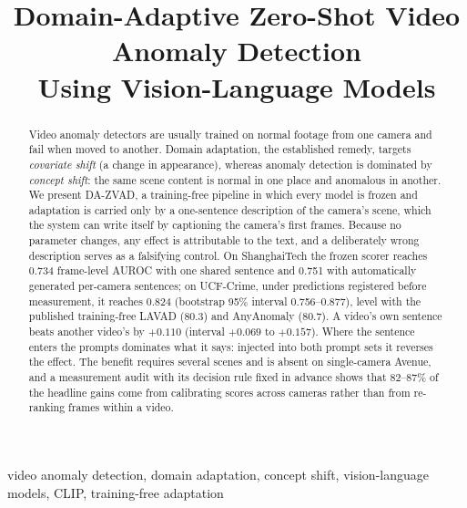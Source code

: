 \documentclass[conference]{IEEEtran}
\begin{document}
\title{Domain-Adaptive Zero-Shot Video Anomaly Detection\\
Using Vision-Language Models}

\author{
}

\maketitle

\begin{abstract}
Video anomaly detectors are usually trained on normal footage from one camera
and fail when moved to another. Domain adaptation, the established remedy,
targets \emph{covariate shift} (a change in appearance), whereas anomaly
detection is dominated by \emph{concept shift}: the same scene content is
normal in one place and anomalous in another. We present DA-ZVAD, a
training-free pipeline in which every model is frozen and adaptation is carried
only by a one-sentence description of the camera's scene, which the system can
write itself by captioning the camera's first frames. Because no parameter
changes, any effect is attributable to the text, and a deliberately wrong
description serves as a falsifying control. On ShanghaiTech the frozen scorer
reaches 0.734 frame-level AUROC with one shared sentence and 0.751 with
automatically generated per-camera sentences; on UCF-Crime, under predictions
registered before measurement, it reaches 0.824 (bootstrap 95\% interval
0.756--0.877), level with the published training-free LAVAD (80.3) and
AnyAnomaly (80.7). A video's own sentence beats another video's by $+0.110$
(interval $+0.069$ to $+0.157$). Where the sentence enters the prompts dominates
what it says: injected into both prompt sets it reverses the effect. The benefit
requires several scenes and is absent on single-camera Avenue, and a measurement
audit with its decision rule fixed in advance shows that 82--87\% of the
headline gains come from calibrating scores across cameras rather than from
re-ranking frames within a video.
\end{abstract}

\begin{IEEEkeywords}
video anomaly detection, domain adaptation, concept shift, vision-language
models, CLIP, training-free adaptation
\end{IEEEkeywords}
\end{document}
